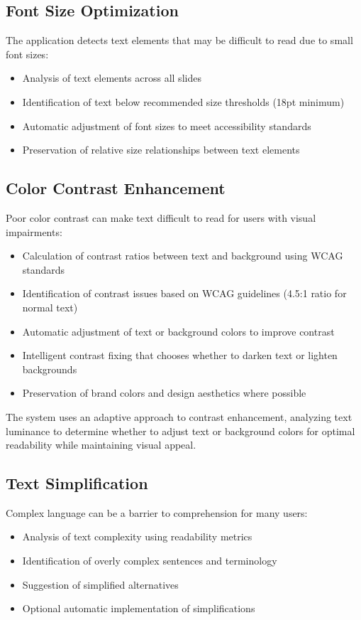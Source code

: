 \documentclass{article}
\begin{document}
\subsection{Font Size Optimization}
The application detects text elements that may be difficult to read due to small font sizes:
\begin{itemize}
    \item Analysis of text elements across all slides
    \item Identification of text below recommended size thresholds (18pt minimum)
    \item Automatic adjustment of font sizes to meet accessibility standards
    \item Preservation of relative size relationships between text elements
\end{itemize}

\subsection{Color Contrast Enhancement}
Poor color contrast can make text difficult to read for users with visual impairments:
\begin{itemize}
    \item Calculation of contrast ratios between text and background using WCAG standards
    \item Identification of contrast issues based on WCAG guidelines (4.5:1 ratio for normal text)
    \item Automatic adjustment of text or background colors to improve contrast
    \item Intelligent contrast fixing that chooses whether to darken text or lighten backgrounds
    \item Preservation of brand colors and design aesthetics where possible
\end{itemize}

The system uses an adaptive approach to contrast enhancement, analyzing text luminance to determine whether to adjust text or background colors for optimal readability while maintaining visual appeal.

\subsection{Text Simplification}
Complex language can be a barrier to comprehension for many users:
\begin{itemize}
    \item Analysis of text complexity using readability metrics
    \item Identification of overly complex sentences and terminology
    \item Suggestion of simplified alternatives
    \item Optional automatic implementation of simplifications
\end{itemize}
\end{document}
